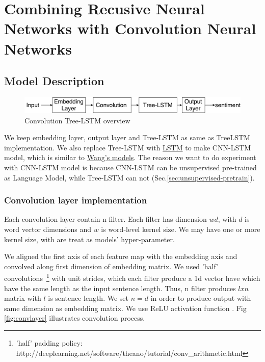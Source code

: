 \hypertarget{sec:CNNtree}{\section{Combining Recusive Neural Networks with Convolution Neural Networks}}\label{sec:CNNtree}
\subsection{Model Description}
\begin{figure}[H]
    \centering
    \includegraphics[width=0.8\linewidth]{figure/convtreelstmsummary}
    \caption[Convolution Tree-LSTM overview]{Convolution Tree-LSTM overview}
    \label{fig:convtreelstmsummary}
\end{figure}

We keep embedding layer, output layer and Tree-LSTM as same as TreeLSTM implementation.
We also replace Tree-LSTM with \hyperref[sec:lstm]{LSTM} to make CNN-LSTM model, which is similar to \hyperref[cnn-rnn]{Wang's models}\cite{cnn-rnn}.  
The reason we want to do experiment with CNN-LSTM model is because CNN-LSTM can be unsupervised pre-trained as Language Model, while Tree-LSTM can not (Sec.\ref{sec:unsupervised-pretrain}).

\subsubsection{Convolution layer implementation} \label{sec:conv1c}
Each convolution layer contain n filter. Each filter has dimension $wd$, with \(d\) is word vector dimensions and \(w\) is word-level kernel size. 
We may have one or more kernel size, with are treat as models' hyper-parameter. 

We aligned the first axis of each feature map with the embedding axis and convolved along first dimension of embedding matrix. 
We used 'half' convolutions~\footnote{'half' padding policy: http://deeplearning.net/software/theano/tutorial/conv\_arithmetic.html} with unit strides, which each filter produce a 1d vector have which have the same length as the input sentence length. 
Thus, n filter produces $l x n$ matrix with $l$ is sentence length. We set $n = d$ in order to produce output with same dimension as embedding matrix. We use ReLU activation function \cite{hahnloser2000digital}. Fig \ref{fig:convlayer} illustrates convolution process. 



